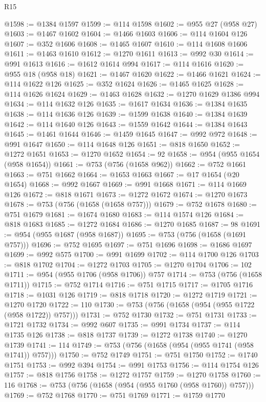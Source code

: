 \begin{lexlean}{R15}
\begin{coremodule}
@1598 := @1384 @1597
@1599 := @114 @1598
@1602 := @955 @27 (@958 @27)
@1603 := @1467 @1602
@1604 := @1466 @1603
@1606 := @114 @1604 @126
@1607 := @352 @1606
@1608 := @1465 @1607
@1610 := @114 @1608 @1606
@1611 := @1463 @1610
@1612 := @1270 @1611
@1613 := @992 @30
@1614 := @991 @1613
@1616 := @1612 @1614 @994
@1617 := @114 @1616
@1620 := @955 @18 (@958 @18)
@1621 := @1467 @1620
@1622 := @1466 @1621
@1624 := @114 @1622 @126
@1625 := @352 @1624
@1626 := @1465 @1625
@1628 := @114 @1626 @1624
@1629 := @1463 @1628
@1632 := @1270 @1629 @1386 @994
@1634 := @114 @1632 @126
@1635 := @1617 @1634
@1636 := @1384 @1635
@1638 := @114 @1636 @126
@1639 := @1599 @1638
@1640 := @1384 @1639
@1642 := @114 @1640 @126
@1643 := @1559 @1642
@1644 := @1384 @1643
@1645 := @1461 @1644
@1646 := @1459 @1645
@1647 := @992 @972
@1648 := @991 @1647
@1650 := @114 @1648 @126
@1651 := @818 @1650
@1652 := @1272 @1651
@1653 := @1270 @1652
@1654 := 92
@1658 := @954 (@955 @1654 (@958 @1654))
@1661 := @753 (@756 (@1658 @962))
@1662 := @752 @1661
@1663 := @751 @1662
@1664 := @1653 @1663
@1667 := @17 @1654 (@20 @1654)
@1668 := @992 @1667
@1669 := @991 @1668
@1671 := @114 @1669 @126
@1672 := @818 @1671
@1673 := @1272 @1672
@1674 := @1270 @1673
@1678 := @753 (@756 (@1658 (@1658 @757)))
@1679 := @752 @1678
@1680 := @751 @1679
@1681 := @1674 @1680
@1683 := @114 @1574 @126
@1684 := @818 @1683
@1685 := @1272 @1684
@1686 := @1270 @1685
@1687 := 98
@1691 := @954 (@955 @1687 (@958 @1687))
@1695 := @753 (@756 (@1658 (@1691 @757)))
@1696 := @752 @1695
@1697 := @751 @1696
@1698 := @1686 @1697
@1699 := @992 @575
@1700 := @991 @1699
@1702 := @114 @1700 @126
@1703 := @818 @1702
@1704 := @1272 @1703
@1705 := @1270 @1704
@1706 := 102
@1711 := @954 (@955 @1706 (@958 @1706)) @757
@1714 := @753 (@756 (@1658 @1711))
@1715 := @752 @1714
@1716 := @751 @1715
@1717 := @1705 @1716
@1718 := @1031 @126
@1719 := @818 @1718
@1720 := @1272 @1719
@1721 := @1270 @1720
@1722 := 110
@1730 := @753 (@756 (@1658 (@954 (@955 @1722 (@958 @1722)) @757)))
@1731 := @752 @1730
@1732 := @751 @1731
@1733 := @1721 @1732
@1734 := @992 @607
@1735 := @991 @1734
@1737 := @114 @1735 @126
@1738 := @818 @1737
@1739 := @1272 @1738
@1740 := @1270 @1739
@1741 := 114
@1749 := @753 (@756 (@1658 (@954 (@955 @1741 (@958 @1741)) @757)))
@1750 := @752 @1749
@1751 := @751 @1750
@1752 := @1740 @1751
@1753 := @992 @394
@1754 := @991 @1753
@1756 := @114 @1754 @126
@1757 := @818 @1756
@1758 := @1272 @1757
@1759 := @1270 @1758
@1760 := 116
@1768 := @753 (@756 (@1658 (@954 (@955 @1760 (@958 @1760)) @757)))
@1769 := @752 @1768
@1770 := @751 @1769
@1771 := @1759 @1770

\end{coremodule}
\end{lexlean}
